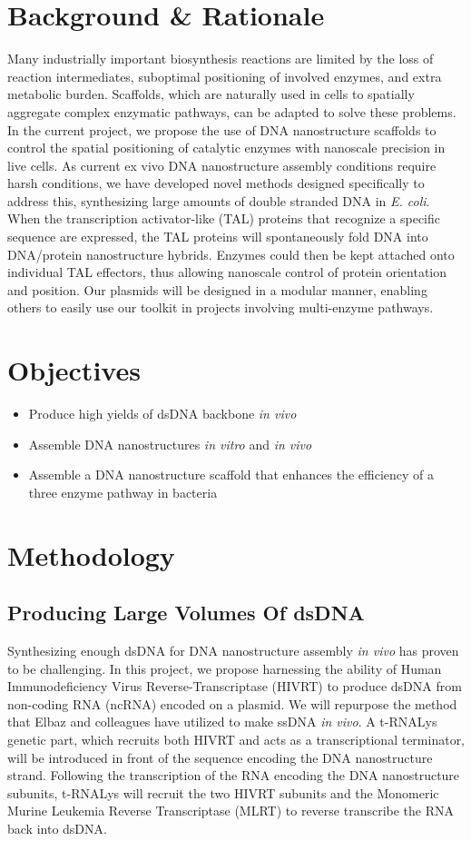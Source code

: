 \documentclass[a4paper]{article}
\begin{document}
\section*{Background \& Rationale}
Many industrially important biosynthesis reactions are limited by the loss of reaction intermediates, suboptimal positioning of involved enzymes, and extra metabolic burden\cite{intro13,intro14}.
Scaffolds, which are naturally used in cells to spatially aggregate complex enzymatic pathways, can be adapted to solve these problems\cite{intro14}.
In the current project, we propose the use of DNA nanostructure scaffolds to control the spatial positioning of catalytic enzymes with nanoscale precision in live cells.
As current ex vivo DNA nanostructure assembly conditions require harsh conditions, we have developed novel methods designed specifically to address this, synthesizing large amounts of double stranded DNA in \textit{E. coli}\cite{intro4}.
When the transcription activator-like (TAL) proteins that recognize a specific sequence are expressed, the TAL proteins will spontaneously fold DNA into DNA/protein nanostructure hybrids\cite{meth2}.
Enzymes could then be kept attached onto individual TAL effectors, thus allowing nanoscale control of protein orientation and position\cite{meth2}.
Our plasmids will be designed in a modular manner, enabling others to easily use our toolkit in projects involving multi-enzyme pathways.
\section*{Objectives}
\begin{itemize}
    \item Produce high yields of dsDNA backbone \textit{in vivo}
    \item Assemble DNA nanostructures \textit{in vitro} and \textit{in vivo}
    \item Assemble a DNA nanostructure scaffold that enhances the efficiency of a three enzyme pathway in bacteria
\end{itemize}
\section*{Methodology}
\subsection*{Producing Large Volumes Of dsDNA}
Synthesizing enough dsDNA for DNA nanostructure assembly \textit{in vivo} has proven to be challenging.
In this project, we propose harnessing the ability of Human Immunodeficiency Virus Reverse-Transcriptase (HIVRT) to produce dsDNA from non-coding RNA (ncRNA) encoded on a plasmid\cite{intro4}.
We will repurpose the method that Elbaz and colleagues have utilized to make ssDNA \textit{in vivo}\cite{meth1}.
A t-RNALys genetic part, which recruits both HIVRT and acts as a transcriptional terminator, will be introduced in front of the sequence encoding the DNA nanostructure strand.
Following the transcription of the RNA encoding the DNA nanostructure subunits, t-RNALys will recruit the two HIVRT subunits and the Monomeric Murine Leukemia Reverse Transcriptase (MLRT) to reverse transcribe the RNA back into dsDNA.
\end{document}
